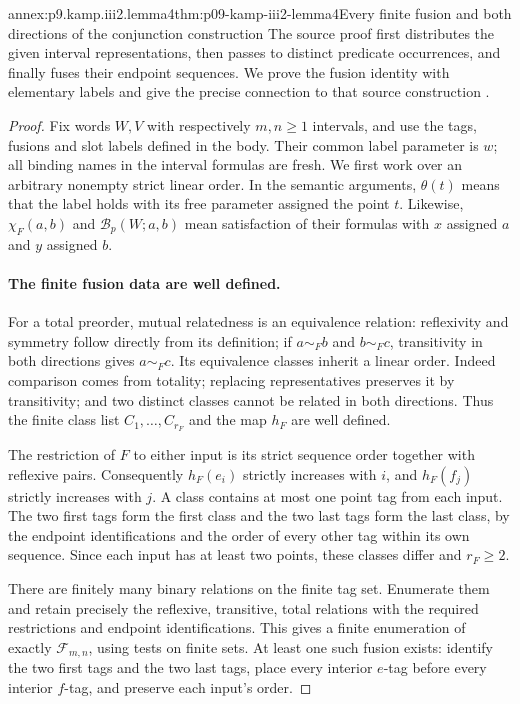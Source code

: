 \begin{annexitem}{annex:p9.kamp.iii2.lemma4}{thm:p09-kamp-iii2-lemma4}{Every finite fusion and both directions of the conjunction construction}
The source proof first distributes the given interval representations,
then passes to distinct predicate occurrences, and finally fuses their
endpoint sequences. We prove the fusion identity with elementary labels
and give the precise connection to that source construction
\cite[ch.~III, pp.~73--78]{Kamp1968}.

\begin{proof}
Fix words \(W,V\) with respectively \(m,n\geq1\) intervals, and
use the tags, fusions and slot labels defined in the body. Their common
label parameter is \(w\); all binding names in the interval formulas
are fresh. We first work over an arbitrary nonempty strict linear order.
In the semantic arguments, \(\theta(t)\) means that the label holds
with its free parameter assigned the point \(t\). Likewise,
\(\chi_F(a,b)\) and \(\mathcal B_p(W;a,b)\) mean satisfaction of their
formulas with \(x\) assigned \(a\) and \(y\) assigned \(b\).

\paragraph{The finite fusion data are well defined.}
For a total preorder, mutual relatedness is an equivalence relation:
reflexivity and symmetry follow directly from its definition; if
\(a\sim_F b\) and \(b\sim_F c\), transitivity in both directions
gives \(a\sim_F c\). Its equivalence classes inherit a linear order.
Indeed comparison comes from totality; replacing representatives preserves
it by transitivity; and two distinct classes cannot be related in both
directions. Thus the finite class list \(C_1,\ldots,C_{r_F}\) and
the map \(h_F\) are well defined.

The restriction of \(F\) to either input is its strict sequence
order together with reflexive pairs. Consequently \(h_F(e_i)\)
strictly increases with \(i\), and \(h_F(f_j)\) strictly increases
with \(j\). A class contains at most one point tag from each input.
The two first tags form the first class and the two last tags form the
last class, by the endpoint identifications and the order of every
other tag within its own sequence. Since each input has at least two
points, these classes differ and \(r_F\geq2\).

There are finitely many binary relations on the finite tag set. Enumerate
them and retain precisely the reflexive, transitive, total relations
with the required restrictions and endpoint identifications. This gives
a finite enumeration of exactly \(\mathcal F_{m,n}\), using tests on
finite sets. At least one such fusion exists: identify the two first
tags and the two last tags, place every interior \(e\)-tag before
every interior \(f\)-tag, and preserve each input's order.


\end{proof}
\end{annexitem}
